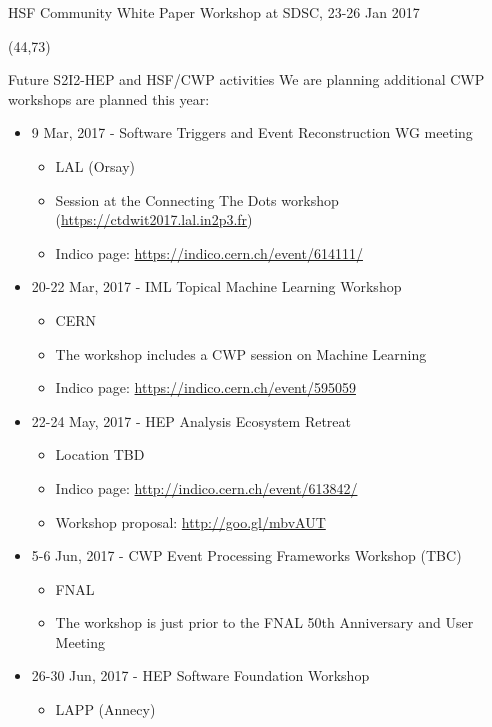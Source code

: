 \documentclass[final]{beamer}
\begin{document}
\begin{frame}{}
\begin{textblock}{38.0}
\begin{block}{HSF Community White Paper Workshop at SDSC, 23-26 Jan 2017}
\end{block}
\end{textblock}

\begin{textblock}{38.0}(44,73)
\begin{block}{Future S2I2-HEP and HSF/CWP activities}
We are planning additional CWP workshops are planned this year: \\
\begin{itemize}
\item 9 Mar, 2017 - Software Triggers and Event Reconstruction WG meeting
    \begin{itemize}
    \item LAL (Orsay)
    \item Session at the Connecting The Dots workshop (\url{https://ctdwit2017.lal.in2p3.fr})
    \item Indico page: \url{https://indico.cern.ch/event/614111/}
    \end{itemize}
\item 20-22 Mar, 2017 - IML Topical Machine Learning Workshop
    \begin{itemize}
    \item CERN
    \item The workshop includes a CWP session on Machine Learning
    \item Indico page: \url{https://indico.cern.ch/event/595059}
    \end{itemize}
\item 22-24 May, 2017 - HEP Analysis Ecosystem Retreat
    \begin{itemize}
    \item Location TBD
    \item Indico page: \url{http://indico.cern.ch/event/613842/}
    \item Workshop proposal: \url{http://goo.gl/mbvAUT}
    \end{itemize}
\item 5-6 Jun, 2017 - CWP Event Processing Frameworks Workshop (TBC)
    \begin{itemize}
    \item FNAL
    \item The workshop is just prior to the FNAL 50th Anniversary and User Meeting
    \end{itemize}
\item 26-30 Jun, 2017 - HEP Software Foundation Workshop
    \begin{itemize}
    \item LAPP (Annecy)

\end{itemize}
\end{itemize}
\end{block}
\end{textblock}
\end{frame}
\end{document}
